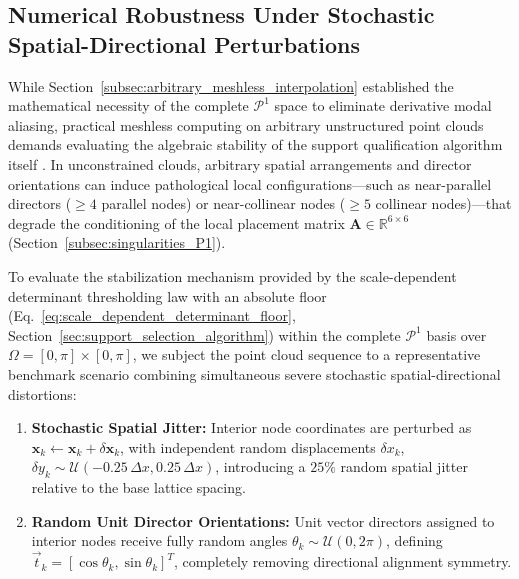 \documentclass[preprint,12pt]{elsarticle}
\begin{document}
\subsection{Numerical Robustness Under Stochastic Spatial-Directional Perturbations}
\label{subsec:stochastic_perturbations}

While Section~\ref{subsec:arbitrary_meshless_interpolation} established the mathematical necessity of the complete $\mathcal{P}^1$ space to eliminate derivative modal aliasing, practical meshless computing on arbitrary unstructured point clouds demands evaluating the algebraic stability of the support qualification algorithm itself \cite{slak2018refined}. In unconstrained clouds, arbitrary spatial arrangements and director orientations can induce pathological local configurations---such as near-parallel directors ($\ge 4$ parallel nodes) or near-collinear nodes ($\ge 5$ collinear nodes)---that degrade the conditioning of the local placement matrix $\mathbf{A} \in \mathbb{R}^{6 \times 6}$ (Section~\ref{subsec:singularities_P1}).

To evaluate the stabilization mechanism provided by the scale-dependent determinant thresholding law with an absolute floor (Eq.~\eqref{eq:scale_dependent_determinant_floor}, Section~\ref{sec:support_selection_algorithm}) within the complete $\mathcal{P}^1$ basis over $\Omega = [0, \pi] \times [0, \pi]$, we subject the point cloud sequence to a representative benchmark scenario combining simultaneous severe stochastic spatial-directional distortions:
\begin{enumerate}
    \item \textbf{Stochastic Spatial Jitter:} Interior node coordinates are perturbed as $\mathbf{x}_k \leftarrow \mathbf{x}_k + \delta\mathbf{x}_k$, with independent random displacements $\delta x_k$, $\delta y_k \sim \mathcal{U}(-0.25\,\Delta x, 0.25\,\Delta x)$, introducing a $25\%$ random spatial jitter relative to the base lattice spacing.
    \item \textbf{Random Unit Director Orientations:} Unit vector directors assigned to interior nodes receive fully random angles $\theta_k \sim \mathcal{U}(0, 2\pi)$, defining $\vec{t}_k = [\cos\theta_k, \sin\theta_k]^T$, completely removing directional alignment symmetry.
\end{enumerate}
\end{document}
